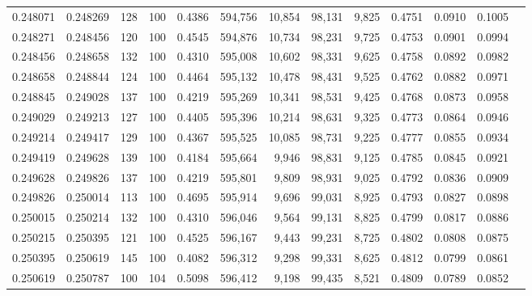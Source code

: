 \begin{tabular}{rrrrrrrrrrrrr}
0.248071 & 0.248269 &   128 & 100 &                                     0.4386 & 594,756 &  10,854 &  98,131 &   9,825 & 0.4751 & 0.0910 & 0.1005 \\
0.248271 & 0.248456 &   120 & 100 &                                     0.4545 & 594,876 &  10,734 &  98,231 &   9,725 & 0.4753 & 0.0901 & 0.0994 \\
0.248456 & 0.248658 &   132 & 100 &                                     0.4310 & 595,008 &  10,602 &  98,331 &   9,625 & 0.4758 & 0.0892 & 0.0982 \\
0.248658 & 0.248844 &   124 & 100 &                                     0.4464 & 595,132 &  10,478 &  98,431 &   9,525 & 0.4762 & 0.0882 & 0.0971 \\
0.248845 & 0.249028 &   137 & 100 &                                     0.4219 & 595,269 &  10,341 &  98,531 &   9,425 & 0.4768 & 0.0873 & 0.0958 \\
0.249029 & 0.249213 &   127 & 100 &                                     0.4405 & 595,396 &  10,214 &  98,631 &   9,325 & 0.4773 & 0.0864 & 0.0946 \\
0.249214 & 0.249417 &   129 & 100 &                                     0.4367 & 595,525 &  10,085 &  98,731 &   9,225 & 0.4777 & 0.0855 & 0.0934 \\
0.249419 & 0.249628 &   139 & 100 &                                     0.4184 & 595,664 &   9,946 &  98,831 &   9,125 & 0.4785 & 0.0845 & 0.0921 \\
0.249628 & 0.249826 &   137 & 100 &                                     0.4219 & 595,801 &   9,809 &  98,931 &   9,025 & 0.4792 & 0.0836 & 0.0909 \\
0.249826 & 0.250014 &   113 & 100 &                                     0.4695 & 595,914 &   9,696 &  99,031 &   8,925 & 0.4793 & 0.0827 & 0.0898 \\
0.250015 & 0.250214 &   132 & 100 &                                     0.4310 & 596,046 &   9,564 &  99,131 &   8,825 & 0.4799 & 0.0817 & 0.0886 \\
0.250215 & 0.250395 &   121 & 100 &                                     0.4525 & 596,167 &   9,443 &  99,231 &   8,725 & 0.4802 & 0.0808 & 0.0875 \\
0.250395 & 0.250619 &   145 & 100 &                                     0.4082 & 596,312 &   9,298 &  99,331 &   8,625 & 0.4812 & 0.0799 & 0.0861 \\
0.250619 & 0.250787 &   100 & 104 &                                     0.5098 & 596,412 &   9,198 &  99,435 &   8,521 & 0.4809 & 0.0789 & 0.0852 \\

\end{tabular}
